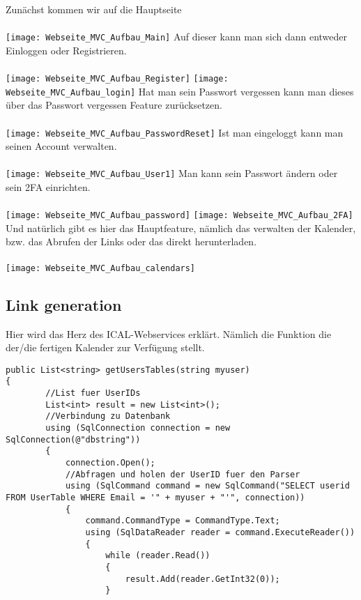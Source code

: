 {Zunächst kommen wir auf die Hauptseite\\ \\
\texttt{[image: Webseite\_MVC\_Aufbau\_Main]}
Auf dieser kann man sich dann entweder Einloggen oder Registrieren. \\ \\
\texttt{[image: Webseite\_MVC\_Aufbau\_Register]}
\texttt{[image: Webseite\_MVC\_Aufbau\_login]}
Hat man sein Passwort vergessen kann man dieses über das Passwort vergessen Feature zurücksetzen. \\ \\
\texttt{[image: Webseite\_MVC\_Aufbau\_PasswordReset]}
Ist man eingeloggt kann man seinen Account verwalten.\\ \\
\texttt{[image: Webseite\_MVC\_Aufbau\_User1]}
Man kann sein Passwort ändern oder sein 2FA einrichten. \\ \\
\texttt{[image: Webseite\_MVC\_Aufbau\_password]}
\texttt{[image: Webseite\_MVC\_Aufbau\_2FA]}
Und natürlich gibt es hier das Hauptfeature, nämlich das verwalten der Kalender, bzw. das Abrufen der Links oder das direkt herunterladen.\\ \\
 \texttt{[image: Webseite\_MVC\_Aufbau\_calendars]}
\subsection{Link generation}
\label{sec:link}
Hier wird das Herz des ICAL-Webservices erklärt. Nämlich die Funktion die der/die fertigen Kalender zur Verfügung stellt.
\begin{lstlisting}
public List<string> getUsersTables(string myuser)
{
        //List fuer UserIDs
        List<int> result = new List<int>();
        //Verbindung zu Datenbank
        using (SqlConnection connection = new SqlConnection(@"dbstring"))
        {
            connection.Open();
            //Abfragen und holen der UserID fuer den Parser
            using (SqlCommand command = new SqlCommand("SELECT userid FROM UserTable WHERE Email = '" + myuser + "'", connection))
            {
                command.CommandType = CommandType.Text;
                using (SqlDataReader reader = command.ExecuteReader())
                {
                    while (reader.Read())
                    {
                        result.Add(reader.GetInt32(0));
                    }


\end{lstlisting}}
